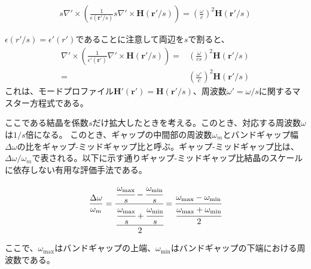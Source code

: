 \documentclass[platex,dvipdfmx,draft]{jsreport}
\numberwithin{equation}{section}
\begin{document}
\begin{align}
  s \nabla' \times \left( \frac{1}{\epsilon(\bm{r}'/s)} s \nabla' \times \bm{H}(\bm{r}'/s) \right)
  = \left( \frac{\omega}{c} \right)^2 \bm{H}(\bm{r}'/s)
\end{align}

$\epsilon(r' / s) = \epsilon' (r')$であることに注意して両辺を$s$で割ると、
\begin{equation}
  \begin{split}
  \nabla' \times \left( \frac{1}{\epsilon'(\bm{r}')} \nabla' \times \bm{H}(\bm{r}' / s) \right) =& \left( \frac{\omega}{cs} \right)^2  \bm{H}(\bm{r}' / s)
  \\
  =& \left( \frac{\omega'}{c} \right)^2 \bm{H}(\bm{r}' / s)
\end{split}
\end{equation}
これは、モードプロファイル$\bm{H}'(\bm{r}') = \bm{H}(\bm{r}' / s)$、周波数$\omega' = \omega / s$に関するマスター方程式である。

ここである結晶を係数$s$だけ拡大したときを考える。このとき、対応する周波数$\omega$は$1 / s$倍になる。
このとき、ギャップの中間部の周波数$\omega_m$とバンドギャップ幅$\Delta \omega$の比をギャップ-ミッドギャップ比と呼ぶ。ギャップ-ミッドギャップ比は、$\Delta \omega / \omega_m$で表される。以下に示す通りギャップ-ミッドギャップ比結晶のスケールに依存しない有用な評価手法である。

\begin{align*}
  \frac{\Delta \omega}{\omega_m} 
  = \cfrac{\cfrac{\omega_{\mathrm{max}}}{s} - \cfrac{\omega_{\mathrm{min}}}{s}}{\cfrac{\cfrac{\omega_{\mathrm{max}}}{s} + \cfrac{\omega_{\mathrm{min}}}{s}}{2}} 
  = \cfrac{\omega_{\mathrm{max}} - \omega_{\mathrm{min}}}{\cfrac{\omega_{\mathrm{max}} + \omega_{\mathrm{min}}}{2}}
\end{align*}

ここで、$\omega_{\mathrm{max}}$はバンドギャップの上端、$\omega_{\mathrm{min}}$はバンドギャップの下端における周波数である。
\end{document}
